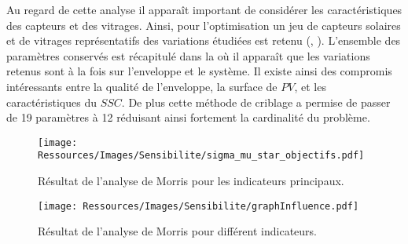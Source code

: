 Au regard de cette analyse il apparaît important de considérer les caractéristiques des capteurs et
des vitrages. Ainsi, pour l’optimisation un jeu de capteurs solaires et de vitrages représentatifs
des variations étudiées est retenu (, ).
L’ensemble des paramètres conservés est récapitulé dans la  où il
apparaît que les variations retenus sont à la fois sur l’enveloppe et le système.
Il existe ainsi des compromis intéressants entre la qualité de l’enveloppe, la surface de $PV$, et
les caractéristiques du $SSC$. De plus cette méthode de criblage a permise de passer de
\num{19} paramètres à \num{12} réduisant ainsi fortement la cardinalité du problème.



\begin{landscape}
    \begin{figure}
        \begin{center}
            \texttt{[image: Ressources/Images/Sensibilite/sigma\_mu\_star\_objectifs.pdf]}
        \end{center}
        \caption{Résultat de l’analyse de Morris pour les indicateurs principaux.
                 \label{fig:sigma_mu_star_objectifs}}
    \end{figure}

    \begin{figure}
      \begin{center}
          \texttt{[image: Ressources/Images/Sensibilite/graphInfluence.pdf]}
      \end{center}
      \caption{Résultat de l’analyse de Morris pour différent indicateurs.
               \label{fig:graphe_influence_objectifs}}
  \end{figure}
\end{landscape}




